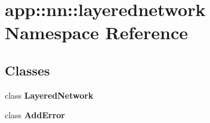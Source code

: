 \section{app::nn::layerednetwork Namespace Reference}
\label{namespaceapp_1_1nn_1_1layerednetwork}


\subsection*{Classes}
\begin{CompactItemize}
\item 
class {\bf LayeredNetwork}
\item 
class {\bf AddError}
\end{CompactItemize}

